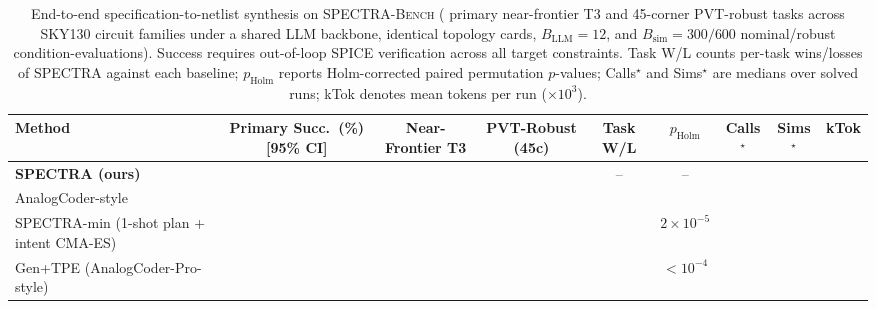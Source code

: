 \begin{table}[t]
\centering
\caption{End-to-end specification-to-netlist synthesis on \textsc{SPECTRA-Bench} (\NPrimaryTasks{} primary near-frontier T3 and 45-corner PVT-robust tasks across \NPrimaryFamilies{} SKY130 circuit families under a shared LLM backbone, identical topology cards, $B_{\text{LLM}}=12$, and $B_{\text{sim}}=300/600$ nominal/robust condition-evaluations). Success requires out-of-loop SPICE verification across all target constraints. Task W/L counts per-task wins/losses of \textsc{SPECTRA} against each baseline; $p_{\text{Holm}}$ reports Holm-corrected paired permutation $p$-values; Calls$^\star$ and Sims$^\star$ are medians over solved runs; kTok denotes mean tokens per run ($\times 10^3$).}
\label{tab:e1g_main}
\footnotesize
\setlength{\tabcolsep}{4.8pt}
\begin{adjustbox}{max width=\textwidth}
\begin{tabular}{@{}lcccccccc@{}}
\toprule
Method & Primary Succ.\ (\%) [95\% CI] & Near-Frontier T3 & PVT-Robust (45c) & Task W/L & $p_{\text{Holm}}$ & Calls$^\star$ & Sims$^\star$ & kTok \\
\midrule
\textbf{SPECTRA (ours)} & \textbf{\SpectraPrim{} \SpectraPrimCI{}} & \textbf{\SpectraTThree{}} & \textbf{\SpectraRobust{}} & -- & -- & \SpectraCalls{} & \SpectraSims{} & \EOneSpectraKTok{} \\
AnalogCoder-style~\cite{lai2025analogcoder} & \DirectPrim{} \DirectPrimCI{} & \DirectTThree{} & \textbf{\DirectRobust{}} & \PrimDirectWL{} & \PrimDirectP{} & \DirectCalls{} & \DirectSims{} & \EOneDirectKTok{} \\
SPECTRA-min (1-shot plan + intent CMA-ES) & \SpectraMinPrim{} \SpectraMinPrimCI{} & \SpectraMinTThree{} & \SpectraMinRobust{} & \PrimSpectraMinWL{} & $2\!\times\!10^{-5}$ & \SpectraMinCalls{} & \SpectraMinSims{} & \EOneSpectraMinKTok{} \\
Gen+TPE (AnalogCoder-Pro-style)~\cite{lai2026analogcoderpro} & \GenboPrim{} \GenboPrimCI{} & \GenboTThree{} & \GenboRobust{} & \PrimGenboWL{} & $<\!10^{-4}$ & \GenboCalls{} & \GenboSims{} & \EOneGenboKTok{} \\
\bottomrule
\end{tabular}
\end{adjustbox}
\end{table}
